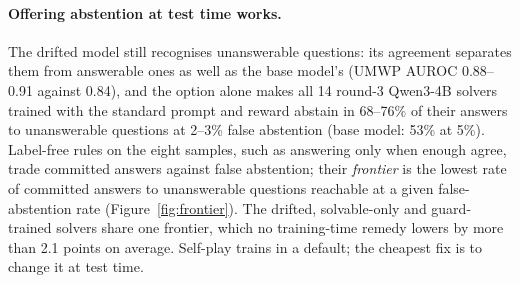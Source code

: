 \paragraph{Offering abstention at test time works.} The drifted model still recognises unanswerable questions: its agreement separates them from answerable ones as well as the base model's (UMWP AUROC 0.88--0.91 against 0.84), and the option alone makes all 14 round-3 Qwen3-4B solvers trained with the standard prompt and reward abstain in 68--76\% of their answers to unanswerable questions at 2--3\% false abstention (base model: 53\% at 5\%). Label-free rules on the eight samples, such as answering only when enough agree, trade committed answers against false abstention; their \emph{frontier} is the lowest rate of committed answers to unanswerable questions reachable at a given false-abstention rate (Figure~\ref{fig:frontier}). The drifted, solvable-only and guard-trained solvers share one frontier, which no training-time remedy lowers by more than 2.1 points on average. Self-play trains in a default; the cheapest fix is to change it at test time.
